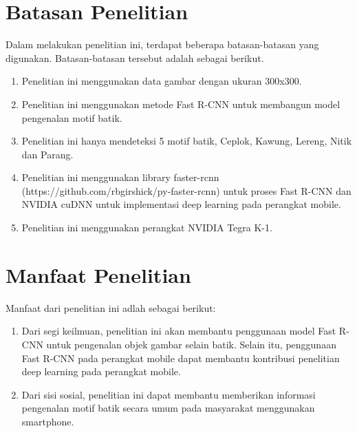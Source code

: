\section{Batasan Penelitian}
Dalam melakukan penelitian ini, terdapat beberapa batasan-batasan yang digunakan. Batasan-batasan tersebut adalah sebagai berikut.
\begin{enumerate}
	\item Penelitian ini menggunakan data gambar dengan ukuran 300x300.
	\item Penelitian ini menggunakan metode Fast R-CNN untuk membangun model pengenalan motif batik.
	\item Penelitian ini hanya mendeteksi 5 motif batik, Ceplok, Kawung, Lereng, Nitik dan Parang.
	\item Penelitian ini menggunakan library faster-rcnn (https://github.com/rbgirshick/py-faster-rcnn) untuk proses Fast R-CNN dan NVIDIA cuDNN untuk implementasi deep learning pada perangkat mobile.
	\item Penelitian ini menggunakan perangkat NVIDIA Tegra K-1.
\end{enumerate}

\section{Manfaat Penelitian}
Manfaat dari penelitian ini adlah sebagai berikut:
\begin{enumerate}
	\item Dari segi keilmuan, penelitian ini akan membantu penggunaan model Fast R-CNN untuk pengenalan objek gambar selain batik. Selain itu, penggunaan Fast R-CNN pada perangkat mobile dapat membantu kontribusi penelitian deep learning pada perangkat mobile.
	\item Dari sisi sosial, penelitian ini dapat membantu memberikan informasi pengenalan motif batik secara umum pada masyarakat menggunakan smartphone.
\end{enumerate}

